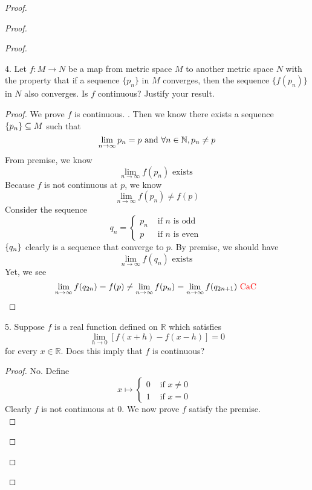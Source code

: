 \documentclass{report}
\begin{document}
\begin{proof}
\begin{proof}
\begin{proof}
\begin{question}{}{}
4. Let \(f : M \rightarrow N\) be a map from metric space \(M\) to another metric space \(N\) with the property
that if a sequence \(\{p_n\}\) in \(M\) converges, then the sequence \(\{f(p_n)\}\) in \(N\) also converges. Is
\(f\) continuous? Justify your result.
\end{question}
\begin{proof}
  We prove $f$ is continuous. . Then we know there exists a sequence $\{ p_n \}\subseteq M$ such that 
  \begin{equation*}
  \lim_{n\to\infty}p_n=p \text{ and } \forall n\in\mathbb{N}, p_n\neq p
  \end{equation*}
From premise, we know 
\begin{equation*}
\lim_{n\to\infty} f(p_n)\text{ exists }
\end{equation*}
Because $f$ is not continuous at  $p$, we know 
 \begin{equation*}
\lim_{n\to\infty}f(p_n)\neq f(p)
\end{equation*}
Consider the sequence 
\begin{equation*}
q_{n}=\begin{cases}
p_n& \text{ if $n$ is odd }\\
p & \text{ if $n$ is even }
\end{cases}
\end{equation*}
$\{ q_n \}$ clearly is a sequence that converge to $p$. By premise, we should have 
\begin{equation*}
\lim_{n\to\infty}f(q_n)\text{ exists }
\end{equation*}
Yet, we see 
\begin{equation*}
\lim_{n\to\infty}f(q_{2n})=f(p)\neq \lim_{n\to\infty}f(p_n)=\lim_{n\to\infty}f(q_{2n+1})\text{ \textcolor{red}{CaC} }
\end{equation*}
\end{proof}
\begin{question}{}{}
5. Suppose \(f\) is a real function defined on \(\mathbb{R}\) which satisfies
\[
\lim_{h \rightarrow 0} [f(x + h) - f(x - h)] = 0
\]
for every \(x \in \mathbb{R}\). Does this imply that \(f\) is continuous?

\end{question}
\begin{proof}
No. Define 
\begin{equation*}
x\mapsto \begin{cases}
  0& \text{ if $x\neq 0$ }\\
  1& \text{ if $x=0$ }
\end{cases}
\end{equation*}
Clearly $f$ is not continuous at $0$. We now prove  $f$ satisfy the premise.\\


\end{proof}
\end{proof}
\end{proof}
\end{proof}
\end{document}
